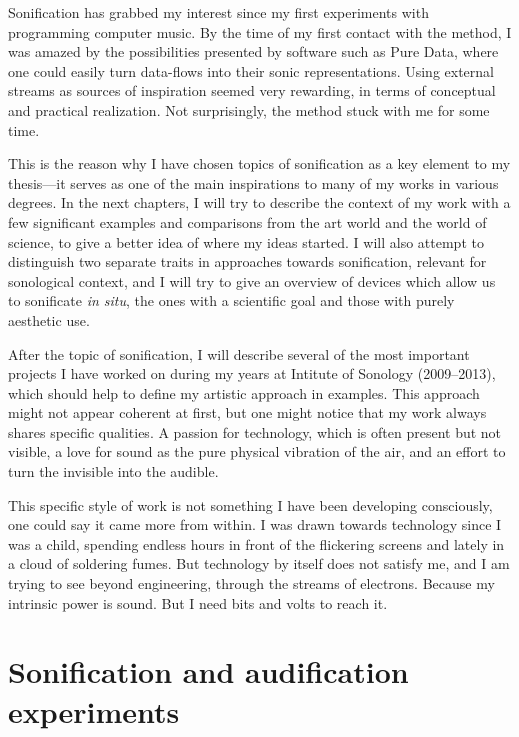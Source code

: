 \documentclass[12pt,a4paper,oneside]{report}
\begin{document}
Sonification has grabbed my interest since my first experiments with programming computer music. By the time of my first contact with the method, I was amazed by the possibilities presented by software such as Pure Data, where one could easily turn data-flows into their sonic representations. Using external streams as sources of inspiration seemed very rewarding, in terms of conceptual and practical realization. Not surprisingly, the method stuck with me for some time.

This is the reason why I have chosen topics of sonification as a key element to my thesis---it serves as one of the main inspirations to many of my works in various degrees. In the next chapters, I will try to describe the context of my work with a few significant examples and comparisons from the art world and the world of science, to give a better idea of where my ideas started. I will also attempt to distinguish two separate traits in approaches towards sonification, relevant for sonological context, and I will try to give an overview of devices which allow us to sonificate \textit{in situ}, the ones with a scientific goal and those with purely aesthetic use.

After the topic of sonification, I will describe several of the most important projects I have worked on during my years at Intitute of Sonology (2009--2013), which should help to define my artistic approach in examples. This approach might not appear coherent at first, but one might notice that my work always shares specific qualities. A passion for technology, which is often present but not visible, a love for sound as the pure physical vibration of the air, and an effort to turn the invisible into the audible.

This specific style of work is not something I have been developing consciously, one could say it came more from within. I was drawn towards technology since I was a child, spending endless hours in front of the flickering screens and lately in a cloud of soldering fumes. But technology by itself does not satisfy me, and I am trying to see beyond engineering, through the streams of electrons. Because my intrinsic power is sound. But I need bits and volts to reach it.


\chapter{Sonification and audification experiments}
\end{document}
